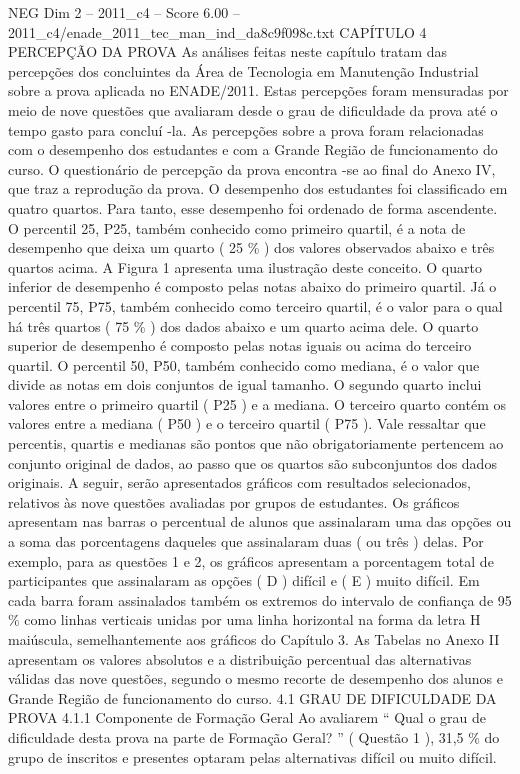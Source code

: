\begin{textsample}{NEG Dim 2 – 2011\_c4 – Score 6.00 – 2011\_c4/enade\_2011\_tec\_man\_ind\_da8c9f098c.txt}  \label{ex:f2_neg_305}
CAPÍTULO 4 PERCEPÇÃO DA PROVA As análises feitas neste capítulo tratam das percepções dos concluintes da Área de Tecnologia em Manutenção Industrial sobre a prova aplicada no ENADE/2011.
Estas percepções foram mensuradas por meio de nove questões que avaliaram desde o grau de dificuldade da prova até o tempo gasto para concluí -la.
As percepções sobre a prova foram relacionadas com o desempenho dos estudantes e com a Grande Região de funcionamento do curso.
O questionário de percepção da prova encontra -se ao final do Anexo IV, que traz a reprodução da prova.
O desempenho dos estudantes foi classificado em quatro quartos.
Para tanto, esse desempenho foi ordenado de forma ascendente.
O percentil 25, P25, também conhecido como primeiro quartil, é a nota de desempenho que deixa um quarto ( 25 \% ) dos valores observados abaixo e três quartos acima.
A Figura 1 apresenta uma ilustração deste conceito.
O quarto inferior de desempenho é composto pelas notas abaixo do primeiro quartil.
Já o percentil 75, P75, também conhecido como terceiro quartil, é o valor para o qual há três quartos ( 75 \% ) dos dados abaixo e um quarto acima dele.
O quarto superior de desempenho é composto pelas notas iguais ou acima do terceiro quartil.
O percentil 50, P50, também conhecido como mediana, é o valor que divide as notas em dois conjuntos de igual tamanho.
O segundo quarto inclui valores entre o primeiro quartil ( P25 ) e a mediana.
O terceiro quarto contém os valores entre a mediana ( P50 ) e o terceiro quartil ( P75 ).
Vale ressaltar que percentis, quartis e medianas são pontos que não obrigatoriamente pertencem ao conjunto original de dados, ao passo que os quartos são subconjuntos dos dados originais.
A seguir, serão apresentados gráficos com resultados selecionados, relativos às nove questões avaliadas por grupos de estudantes.
Os gráficos apresentam nas barras o percentual de alunos que assinalaram uma das opções ou a soma das porcentagens daqueles que assinalaram duas ( ou três ) delas.
Por exemplo, para as questões 1 e 2, os gráficos apresentam a porcentagem total de participantes que assinalaram as opções ( D ) difícil e ( E ) muito difícil.
Em cada barra foram assinalados também os extremos do intervalo de confiança de 95 \% como linhas verticais unidas por uma linha horizontal na forma da letra H maiúscula, semelhantemente aos gráficos do Capítulo 3.
As Tabelas no Anexo II apresentam os valores absolutos e a distribuição percentual das alternativas válidas das nove questões, segundo o mesmo recorte de desempenho dos alunos e Grande Região de funcionamento do curso. 4.1 GRAU DE DIFICULDADE DA PROVA 4.1.1 Componente de Formação Geral Ao avaliarem “ Qual o grau de dificuldade desta prova na parte de Formação Geral? ” ( Questão 1 ), 31,5 \% do grupo de inscritos e presentes optaram pelas alternativas difícil ou muito difícil.

\end{textsample}
